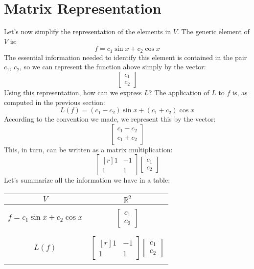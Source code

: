 \documentclass[12pt]{article}
\begin{document}
\section{Matrix Representation}
Let's now simplify the representation of the elements in $V$. The generic element of $V$ is:
\[
f = c_1\sin x + c_2\cos x
\]
The essential information needed to identify this element is contained in the pair $c_1$, $c_2$, so we can represent the function above simply by the vector:
\[
\begin{bmatrix}c_1\\c_2\end{bmatrix}
\]
Using this representation, how can we express $L$? The application of $L$ to $f$ is, as computed in the previous section:
\[
L(f)=(c_1-c_2)\sin x + (c_1+c_2)\cos x
\]
According to the convention we made, we represent this by the vector:
\[
\begin{bmatrix}c_1-c_2\\c_1+c_2\end{bmatrix}
\]
This, in turn, can be written as a matrix multiplication:
\[
\begin{bmatrix*}[r]1&-1\\1&1\end{bmatrix*}\begin{bmatrix}c_1\\c_2\end{bmatrix}
\]
Let's summarize all the information we have in a table:
\begin{center}
\begin{tabular}{|c|c|}\hline
$V$ & $\mathbb{R}^2$\\\hline
&\\
$f=c_1\sin x+c_2\cos x$ & $\displaystyle\begin{bmatrix}c_1\\c_2\end{bmatrix}$\\
&\\\hline&\\
$L(f)$ & $\displaystyle\begin{bmatrix*}[r]1&-1\\1&1\end{bmatrix*}\begin{bmatrix}c_1\\c_2\end{bmatrix}$\\
&\\\hline
\end{tabular}
\end{center}
\end{document}
